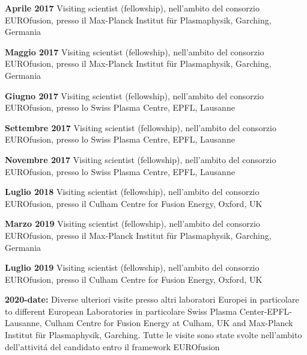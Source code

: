 \begin{enumerate}[label={[F\arabic*]}]
 \item \textbf{Aprile 2017} Visiting scientist (fellowship), nell'ambito del
  consorzio EUROfusion, presso il Max-Planck
  Institut f\"ur Plasmaphysik, Garching, Germania

\item \textbf{Maggio 2017} Visiting scientist (fellowship), nell'ambito del
  consorzio EUROfusion, presso il Max-Planck
  Institut f\"ur Plasmaphysik, Garching, Germania

\item \textbf{Giugno 2017} Visiting scientist (fellowship), nell'ambito del
  consorzio EUROfusion, presso lo Swiss Plasma Centre, EPFL,  Lausanne

\item \textbf{Settembre 2017} Visiting scientist (fellowship), nell'ambito del
  consorzio EUROfusion, presso lo Swiss Plasma Centre, EPFL,  Lausanne

 \item \textbf{Novembre 2017} Visiting scientist (fellowship), nell'ambito del
  consorzio EUROfusion, presso lo Swiss Plasma Centre, EPFL,  Lausanne

\item \textbf{Luglio 2018} Visiting scientist (fellowship), nell'ambito del
  consorzio EUROfusion, presso il Culham Centre for
  Fusion Energy, Oxford, UK

 \item \textbf{Marzo 2019} Visiting scientist (fellowship), nell'ambito del
  consorzio EUROfusion, presso il Max-Planck
  Institut f\"ur Plasmaphysik, Garching, Germania

\item \textbf{Luglio 2019} Visiting scientist (fellowship), nell'ambito del
  consorzio EUROfusion, presso il Culham Centre for
  Fusion Energy, Oxford, UK

\item \textbf{2020-date:}  Diverse ulteriori visite presso altri
  laboratori Europei in particolare to different European
  Laboratories
in particolare  Swiss Plasma Center-EPFL-Lausanne,  Culham Centre for Fusion Energy
at Culham, UK and Max-Planck
  Institut f\"ur Plasmaphysik, Garching. Tutte le visite sono state
  svolte nell'ambito dell'attivit\'a del candidato entro il framework EUROfusion
\end{enumerate}

